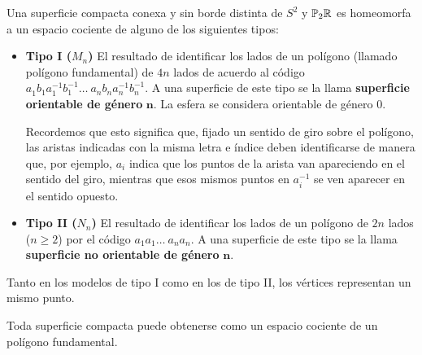 \documentclass[GTSResumen.tex]{subfiles}
\begin{document}
\begin{teorema}
Una superficie compacta conexa y sin borde distinta de $S^2$ y $\mathbb{P}_2\mathbb{R}$ es homeomorfa a un espacio cociente de alguno de los siguientes tipos:
\begin{itemize}
\item \textbf{Tipo I ($M_n$)}
El resultado de identificar los lados de un polígono (llamado polígono fundamental) de $4n$ lados de acuerdo al código $a^{}_1 b^{}_1 a^{-1}_1 b^{-1}_1\dots\ a^{}_n b^{}_n a_n^{-1} b_n^{-1}$. A una superficie de este tipo se la llama \textbf{superficie orientable de género} $\mathbf{n}$. La esfera se considera orientable de género $0$.

Recordemos que esto significa que, fijado un sentido de giro sobre el polígono, las aristas indicadas con la misma letra e índice deben identificarse de manera que, por ejemplo,  $a_i$ indica que los puntos de la arista van apareciendo en el sentido del giro, mientras que esos mismos puntos en  $a_i^{-1}$ se ven aparecer  en el sentido opuesto.


\item \textbf{Tipo II ($N_n$)}
El resultado de identificar los lados de un polígono de $2n$ lados ($n\geq 2$) por el código $a_1 a_1 \dots\ a_n a_n$. A una superficie de este tipo se la llama \textbf{superficie no orientable de género} $\mathbf{n}$.

\end{itemize}
\end{teorema}



\begin{observacion} Tanto en los modelos de tipo I como en los de tipo II, los vértices representan un mismo punto.


\end{observacion}
\begin{comment}
Para que el teorema tenga sentido es necesario que todas las superficies compactas sin borde puedan ser expresadas tal como hemos definido los dos tipos. Esto es cierto también para las compactas con borde. Por ello, tenemos el siguiente teorema.
\end{comment}
\begin{teorema} Toda superficie compacta puede obtenerse  como un espacio cociente de un polígono fundamental.
\end{teorema}
\end{document}
